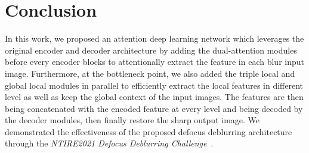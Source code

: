 \documentclass[final]{cvpr}
\begin{document}
\section{Conclusion}
In this work, we proposed an attention deep learning network which leverages the original encoder and decoder architecture by adding the dual-attention modules before every encoder blocks to attentionally extract the feature in each blur input image. Furthermore, at the bottleneck point, we also added the triple local and global local modules in parallel to efficiently extract the local features in different level as well as keep the global context of the input images. The features are then being concatenated with the encoded feature at every level and being decoded by the decoder modules, then finally restore the sharp output image. We demonstrated the effectiveness of the proposed defocus deblurring architecture through the \textit{NTIRE2021 Defocus Deblurring Challenge~\cite{ntire}}.



\end{document}
